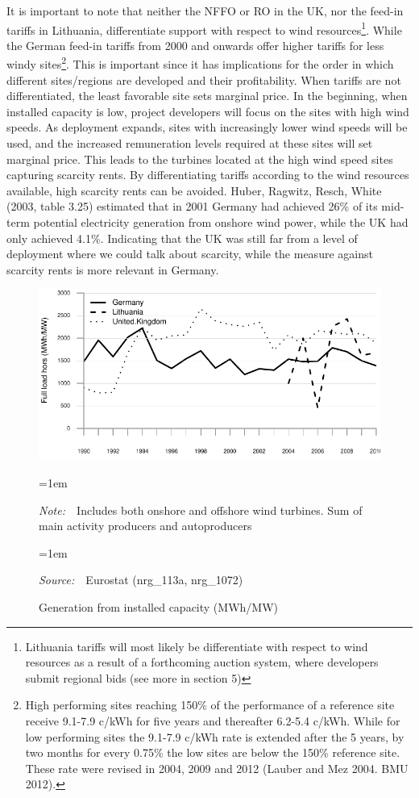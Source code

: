 \documentclass[a4paper, 12pt]{article}
\newcommand{\Figtext}[1]{%
	\begin{tablenotes}[para,flushleft]
		\hangindent=1em
		\footnotesize
		\raggedright
		#1
	\end{tablenotes}
}
\newcommand{\Fignote}[1]{\Figtext{\emph{Note:~}~#1}}
\newcommand{\Figsource}[1]{\Figtext{\emph{Source:~}~#1}}
\begin{document}
It is important to note that neither the NFFO or RO in the UK, nor the feed-in tariffs in Lithuania, differentiate support with respect to wind resources\footnote{Lithuania tariffs will most likely be differentiate with respect to wind resources as a result of a forthcoming auction system, where developers submit regional bids (see more in section 5)}. While the German feed-in tariffs from 2000 and onwards offer higher tariffs for less windy sites\footnote{High performing sites reaching 150\% of the performance of a reference site receive 9.1-7.9 c/kWh for five years and thereafter 6.2-5.4 c/kWh. While for low performing sites the 9.1-7.9 c/kWh rate is extended after the 5 years, by two months for every 0.75\% the low sites are below the 150\% reference site. These rate were revised in 2004, 2009 and 2012 (Lauber and Mez 2004. BMU 2012).}. This is important since it has implications for the order in which different sites/regions are developed and their profitability. When tariffs are not differentiated, the least favorable site sets marginal price. In the beginning, when installed capacity is low, project developers will focus on the sites with high wind speeds. As deployment expands, sites with increasingly lower wind speeds will be used, and the increased remuneration levels required at these sites will set marginal price. This leads to the turbines located at the high wind speed sites capturing scarcity rents. By differentiating tariffs according to the wind resources available, high scarcity rents can be avoided. Huber, Ragwitz, Resch, White (2003, table 3.25) estimated that in 2001 Germany had achieved 26\% of its mid-term potential electricity generation from onshore wind power, while the UK had only achieved 4.1\%. Indicating that the UK was still far from a level of deployment where we could talk about scarcity, while the measure against scarcity rents is more relevant in Germany.

\begin{figure}
	\centering
	\caption{Generation from installed capacity (MWh/MW)}
	\includegraphics[width=1\textwidth]{figure_generation-capacity}
	\Fignote{Includes both onshore and offshore wind turbines. Sum of main activity producers and autoproducers}
	\Figsource{Eurostat (nrg\_113a, nrg\_1072)}
	\label{fig:figure_generation-capacity}
\end{figure}
\end{document}
